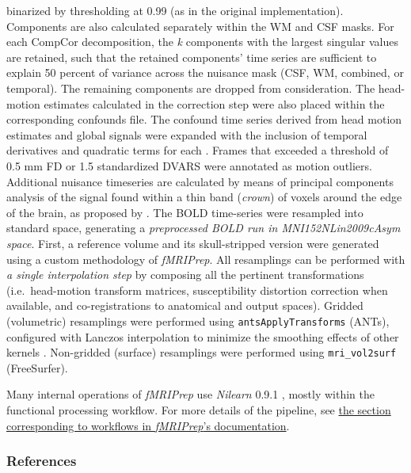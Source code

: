 \documentclass[
]{article}
\begin{document}
\begin{description}
binarized by thresholding at 0.99 (as in the original implementation).
Components are also calculated separately within the WM and CSF masks.
For each CompCor decomposition, the \emph{k} components with the largest
singular values are retained, such that the retained components' time
series are sufficient to explain 50 percent of variance across the
nuisance mask (CSF, WM, combined, or temporal). The remaining components
are dropped from consideration. The head-motion estimates calculated in
the correction step were also placed within the corresponding confounds
file. The confound time series derived from head motion estimates and
global signals were expanded with the inclusion of temporal derivatives
and quadratic terms for each \citep{confounds_satterthwaite_2013}.
Frames that exceeded a threshold of 0.5 mm FD or 1.5 standardized DVARS
were annotated as motion outliers. Additional nuisance timeseries are
calculated by means of principal components analysis of the signal found
within a thin band (\emph{crown}) of voxels around the edge of the
brain, as proposed by \citep{patriat_improved_2017}. The BOLD
time-series were resampled into standard space, generating a
\emph{preprocessed BOLD run in MNI152NLin2009cAsym space}. First, a
reference volume and its skull-stripped version were generated using a
custom methodology of \emph{fMRIPrep}. All resamplings can be performed
with \emph{a single interpolation step} by composing all the pertinent
transformations (i.e.~head-motion transform matrices, susceptibility
distortion correction when available, and co-registrations to anatomical
and output spaces). Gridded (volumetric) resamplings were performed
using \texttt{antsApplyTransforms} (ANTs), configured with Lanczos
interpolation to minimize the smoothing effects of other kernels
\citep{lanczos}. Non-gridded (surface) resamplings were performed using
\texttt{mri\_vol2surf} (FreeSurfer).
\end{description}

Many internal operations of \emph{fMRIPrep} use \emph{Nilearn} 0.9.1
\citep[RRID:SCR\_001362]{nilearn}, mostly within the functional
processing workflow. For more details of the pipeline, see
\href{https://fmriprep.readthedocs.io/en/latest/workflows.html}{the
section corresponding to workflows in \emph{fMRIPrep}'s documentation}.

\hypertarget{references}{%
\subsubsection{References}\label{references}}

  
\end{document}
